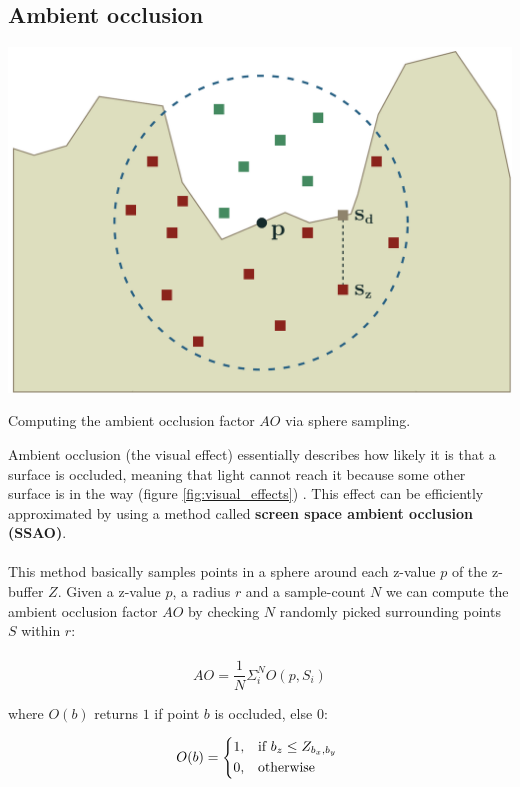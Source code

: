 \documentclass{ACGSeminar}
\begin{document}
	\subsection{Ambient occlusion}
		\begin{floatingfigure}[r]{.5\textwidth}%
			\includegraphics[width=.5\textwidth]{img/ao_sphere_sampling.png}%

			\caption{Computing the ambient occlusion factor $AO$ via sphere sampling.}%
			\label{fig:ao_sphere_sampling}%
		\end{floatingfigure}%


		Ambient occlusion (the visual effect) essentially describes how likely it is that a surface is occluded, meaning that light cannot reach it because some other surface is in the way (figure \ref{fig:visual_effects}) \cite{AOM}. This effect can be efficiently approximated by using a method called \textbf{screen space ambient occlusion (SSAO)}. \\\\
		
		This method basically samples points in a sphere around each z-value $p$ of the z-buffer $Z$. Given a z-value $p$, a radius $r$ and a sample-count $N$ we can compute the ambient occlusion factor $AO$ by checking $N$ randomly picked surrounding points $S$ within $r$:
		\\\\
		$$ AO = \frac{1}{N} \Sigma_{i}^{N} O(p, S_i) $$

		where $O(b)$ returns $1$ if point $b$ is occluded, else $0$:

		\[
			O(b) = 
			\begin{dcases*} 
			\text{1,} & if  $b_{z} \leq Z_{b_{x}, b_{y}}$ \\ 
			\text{0,} & otherwise 
			\end{dcases*} 
		\]
\end{document}
